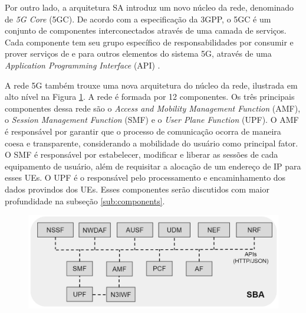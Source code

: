 Por outro lado, a arquitetura SA introduz um novo núcleo da rede, denominado de \textit{5G Core} (5GC).
De acordo com a especificação da 3GPP, o 5GC é um conjunto de componentes interconectados através de uma camada de serviços. Cada componente tem seu grupo específico de responsabilidades por consumir e prover serviços de e para outros elementos do sistema 5G, através de uma \textit{Application Programming Interface} (API) \cite{3gpp.21.205}.

A rede 5G também trouxe uma nova arquitetura do núcleo da rede, ilustrada em alto nível na Figura \ref{fig:5Gcore}. A rede é formada por 12 componentes. Os três principais componentes dessa rede são o \textit{Access and Mobility Management Function} (AMF), o \textit{Session Management Function} (SMF) e o \textit{User Plane Function} (UPF).
O AMF é responsável por garantir que o processo de comunicação ocorra de maneira coesa e transparente, considerando a mobilidade do usuário como principal fator.
O SMF é responsável por estabelecer, modificar e liberar as sessões de cada equipamento de usuário, além de requisitar a alocação de um endereço de IP para esses UEs.
O UPF é o responsável pelo processamento e encaminhamento dos dados provindos dos UEs. Esses componentes serão discutidos com maior profundidade na subseção \ref{sub:components}.

\begin{figure}[!ht]
    \centering
    \includegraphics[width=1\textwidth]{TG2/Chapters/Background/Figures/Background-Core5G.png}
    \label{fig:5Gcore}
\end{figure}

